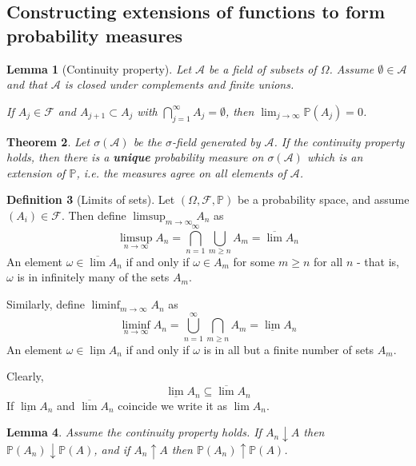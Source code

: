 \documentclass[10pt, oneside, reqno]{amsart}
\theoremstyle{plain}%
\newtheorem{thm}{Theorem}[section]
\newtheorem{lem}[thm]{Lemma}
\theoremstyle{definition}
\newtheorem{defn}[thm]{Definition}
\theoremstyle{remark}
\newcommand{\sigf}{\mathcal{F}}
\renewcommand{\P}{\mathbb{P}}
\begin{document}
\subsection{Constructing extensions of functions to form probability measures} %
\label{sub:constructing_extensions_of_functions_to_form_probability_measures}


\begin{lem}[Continuity property]
	Let $\mathcal{A}$ be a field of subsets of $\Omega$.  Assume $\emptyset \in \mathcal{A}$ and that $\mathcal{A}$ is closed under complements and finite unions.

	If $A_j \in \sigf$ and $A_{j+1} \subset A_j$ with $\bigcap_{j=1}^\infty A_j = \emptyset$, then $\lim_{j \rightarrow \infty} \P(A_j) = 0$.
\end{lem}

\begin{thm}
	Let $\sigma( \mathcal{A})$ be the $\sigma$-field generated by $\mathcal{A}$.  If the continuity property holds, then there is a \textbf{unique} probability measure on $\sigma(\mathcal{A})$ which is an extension of $\P$, i.e. the measures agree on all elements of $\mathcal{A}$.  
\end{thm}


\begin{defn}[Limits of sets] Let $(\Omega, \sigf, \P)$ be a probability space, and assume $(A_i) \in \sigf$.  Then define $\limsup_{m \rightarrow \infty} A_n$ as \[
	\limsup_{n \rightarrow \infty} A_n = \bigcap_{n = 1}^\infty \bigcup_{m \geq n} A_m = \overline{\lim} A_n
\] 
An element $\omega \in \overline{\lim} A_n$ if and only if $\omega \in A_m$ for some $m \geq n$ for all $n$ - that is, $\omega$ is in infinitely many of the sets $A_m$.

Similarly, define $\liminf_{m \rightarrow \infty} A_n$ as \[
	\liminf_{n \rightarrow \infty} A_n = \bigcup_{n = 1}^\infty \bigcap_{m \geq n} A_m = \underline{\lim} A_n
\] 
An element $\omega \in \underline{\lim} A_n$ if and only if $\omega$ is in all but a finite number of sets $A_m$.  

Clearly, \[
	\underline{\lim}A_n \subseteq \overline{\lim} A_n
\]
If $\underline{\lim}A_n$ and $\overline{\lim}A_n$ coincide we write it as $\lim A_n$.
\end{defn}

\begin{lem}\label{lem:problim}
	Assume the continuity property holds.  If $A_n \downarrow A$ then $\P(A_n) \downarrow \P(A)$, and if $A_n \uparrow A$ then $\P(A_n) \uparrow \P(A)$. 
	
\end{lem}
\end{document}

